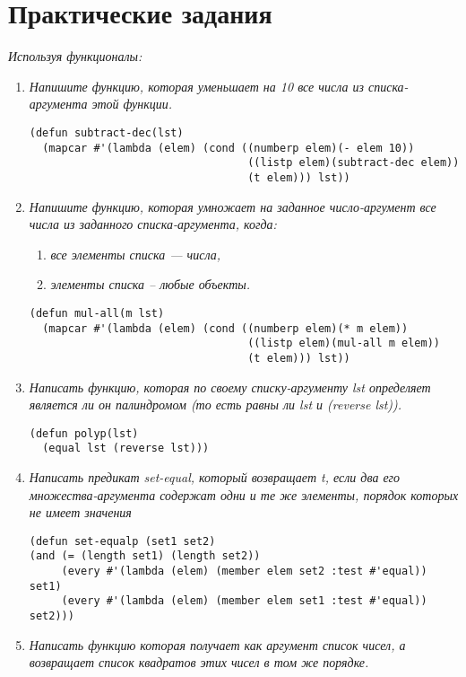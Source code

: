 \chapter{Практические задания}
\textit{Используя функционалы:}
\begin{enumerate}[wide=0pt]
\item \textit{Напишите функцию, которая уменьшает на 10 все числа из списка-аргумента этой функции.}
\begin{lstlisting}
(defun subtract-dec(lst)
  (mapcar #'(lambda (elem) (cond ((numberp elem)(- elem 10))
                                  ((listp elem)(subtract-dec elem))
                                  (t elem))) lst))
\end{lstlisting}
\item \textit{Напишите функцию, которая умножает на заданное число-аргумент все числа из заданного списка-аргумента, когда:}
\begin{enumerate}
	\item \textit{все элементы списка --- числа,}
	\item \textit{элементы списка -- любые объекты.}
\end{enumerate}
\begin{lstlisting}
(defun mul-all(m lst)
  (mapcar #'(lambda (elem) (cond ((numberp elem)(* m elem))
                                  ((listp elem)(mul-all m elem))
                                  (t elem))) lst))
\end{lstlisting}
\item \textit{Написать функцию, которая по своему списку-аргументу lst определяет является ли он палиндромом (то есть равны ли lst и (reverse lst)).}
\begin{lstlisting}
(defun polyp(lst) 
  (equal lst (reverse lst)))
\end{lstlisting}
\item \textit{Написать предикат set-equal, который возвращает t, если два его \\ множества-аргумента содержат одни и те же элементы, порядок которых не имеет значения}
\begin{lstlisting}
(defun set-equalp (set1 set2)
(and (= (length set1) (length set2))
     (every #'(lambda (elem) (member elem set2 :test #'equal)) set1)
     (every #'(lambda (elem) (member elem set1 :test #'equal)) set2)))
\end{lstlisting}
\item \textit{Написать функцию которая получает как аргумент список чисел, а возвращает список квадратов этих чисел в том же порядке.}

\end{enumerate}
